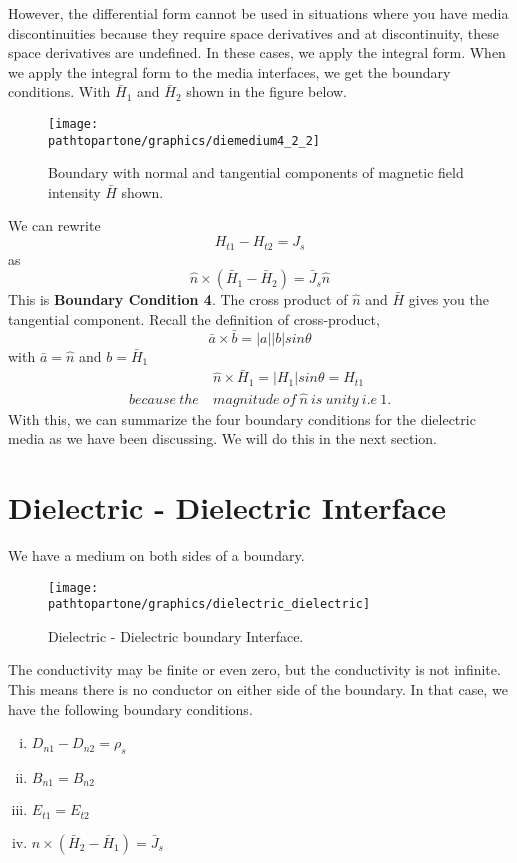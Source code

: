However, the differential form cannot be used in situations where you have media discontinuities because they require space derivatives and at discontinuity, these space derivatives are undefined. In these cases, we apply the integral form. When we apply the integral form to the media interfaces, we get the boundary conditions. With $\bar{H}_1$ and $\bar{H}_2$ shown in the figure below.
\begin{figure}[h]
\centering
\texttt{[image: \\pathtopartone/graphics/diemedium4\_2\_2]}
\caption{Boundary with normal and tangential components of magnetic field intensity $\bar{H}$ shown.}
\end{figure}

We can rewrite 
\begin{equation*}
H_{t1} - H_{t2} = J_s
\end{equation*}
as
\begin{equation}
\hat{n} \times (\bar{H}_1 - \bar{H}_2) = \bar{J}_s\hat{n}
\end{equation}
This is \textbf{Boundary Condition 4}. The cross product of $\hat{n}$ and $\bar{H}$ gives you the tangential component. Recall the definition of cross-product,
\begin{equation*}
\bar{a}\times\bar{b} = \left|a \right| \left|b \right|sin\theta 
\end{equation*}
with $\bar{a} = \hat{n}$ and $ b = \bar{H}_1$
\begin{align*}
&\hat{n}\times\bar{H}_1 = \left|H_1 \right|sin\theta = H_{t1} \\ because\ the\ & magnitude\ of\ \hat{n}\ is\ unity\ i.e\ 1.
\end{align*}
With this, we can summarize the four boundary conditions for the dielectric media as we have been discussing. We will do this in the next section.
\section{Dielectric - Dielectric Interface}
We have a medium on both sides of a boundary.
\begin{figure}[h]
\centering
\texttt{[image: \\pathtopartone/graphics/dielectric\_dielectric]}
\caption{Dielectric - Dielectric boundary Interface.}
\end{figure}

The conductivity may be finite or even zero, but the conductivity is not infinite. This means there is no conductor on either side of the boundary. In that case, we have the following boundary conditions.
\begin{enumerate}[(i)]
\item $D_{n1} - D_{n2} = \rho_s$
\item $B_{n1} = B_{n2}$
\item $E_{t1} = E_{t2}$
\item $\hat{n} \times (\bar{H}_2 - \bar{H}_1) = \bar{J}_s$
\end{enumerate}

